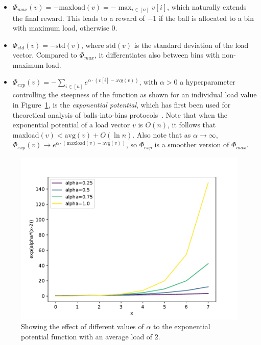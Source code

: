 \begin{itemize}
    \item
    $\Phi_{max}(v)=-\mathrm{maxload}(v)=- \max_{i \in [n]} v[i]$, which naturally extends the final reward. This leads to a reward of $-1$ if the ball is allocated to a bin with maximum load, otherwise $0$.
    \item
    $\Phi_{std}(v)=-\mathrm{std}(v)$, where $\mathrm{std}(v)$ is the standard deviation of the load vector. Compared to $\Phi_{max}$, it differentiates also between bins with non-maximum load.
    \item
    $\Phi_{exp}(v)=-\sum_{i \in [n]} e^{\alpha \cdot  (v[i] - \mathrm{avg}(v))}$, with $\alpha>0$ a hyperparameter controlling the steepness of the function as shown for an individual load value in Figure~\ref{exponential-potential-alpha}, is the \textit{exponential potential}, which has first been used for theoretical analysis of balls-into-bins protocols~\cite{ghosh1999exponentialpotential}. Note that when the exponential potential of a load vector $v$ is $O(n)$, it follows that $\mathrm{maxload}(v) < \mathrm{avg}(v)+O(\ln n)$. Also note that as $\alpha \to \infty$, $\Phi_{exp}(v) \to e^{\alpha \cdot  (\mathrm{maxload}(v) - \mathrm{avg}(v))}$, so $\Phi_{exp}$ is a smoother version of $\Phi_{max}$.
\end{itemize}


\begin{figure}[ht]
    \centering
    \includegraphics[scale=0.7]{Chapter3/Figs/exponential_potential_analysis.pdf}
    \caption{Showing the effect of different values of $\alpha$ to the exponential potential function with an average load of $2$.}
    \label{exponential-potential-alpha}
\end{figure}



